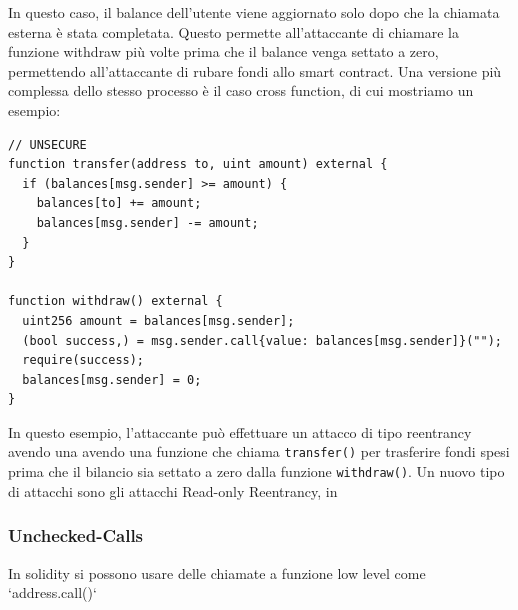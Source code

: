 \documentclass[../../Thesis.tex]{subfiles}
\begin{document}
In questo caso, il balance dell'utente viene aggiornato solo dopo che la chiamata esterna è stata completata. Questo permette all'attaccante di chiamare la funzione withdraw più volte prima che il balance venga settato a zero, permettendo all'attaccante di rubare fondi allo smart contract.
Una versione più complessa dello stesso processo è il caso cross function, di cui mostriamo un esempio:
\begin{lstlisting}[language=Solidity]
    // UNSECURE
function transfer(address to, uint amount) external {
  if (balances[msg.sender] >= amount) {
    balances[to] += amount;
    balances[msg.sender] -= amount;
  }
}

function withdraw() external {
  uint256 amount = balances[msg.sender];
  (bool success,) = msg.sender.call{value: balances[msg.sender]}("");
  require(success);
  balances[msg.sender] = 0;
}
\end{lstlisting}
In questo esempio, l'attaccante può effettuare un attacco di tipo reentrancy avendo una avendo una funzione che chiama \texttt{transfer()} per trasferire fondi spesi prima che il bilancio sia settato a zero dalla funzione \texttt{withdraw()}.
Un nuovo tipo di attacchi sono gli attacchi Read-only Reentrancy, in 
\subsubsection{Unchecked-Calls}
In solidity si possono usare delle chiamate a funzione low level come `address.call()`
\end{document}
